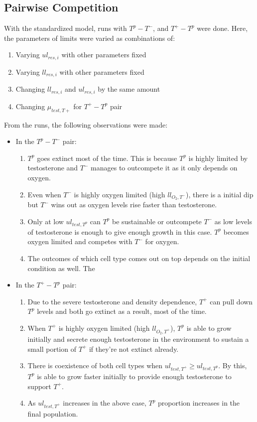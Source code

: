 \documentclass[11pt,a4paper]{article}
\begin{document}
\subsection{Pairwise Competition}
With the standardized model, runs with $T^p - T^-$, and $T^+ - T^p$ were done. Here, the parameters of limits were varied as combinations of:
\begin{enumerate}
  \item Varying $ul_{res,i}$ with other parameters fixed
  \item Varying $ll_{res,i}$ with other parameters fixed
  \item Changing $ll_{res,i}$ and $ul_{res,i}$ by the same amount
  \item Changing $\mu_{test,T+}$ for $T^+ - T^p$ pair
\end{enumerate}
From the runs, the following observations were made:
\begin{itemize}
  \item In the $T^p - T^-$ pair:
  \begin{enumerate}
    \item $T^p$ goes extinct most of the time. This is because $T^p$ is highly limited by testosterone and $T^-$ manages to outcompete it as it only depends on oxygen.
    \item Even when $T^-$ is highly oxygen limited (high $ll_{O_2,T^-}$), there is a initial dip but $T^-$ wins out as oxygen levels rise faster than testosterone.
    \item Only at low $ul_{test,T^p}$ can $T^p$ be sustainable or outcompete $T^-$ as low levels of testosterone is enough to give enough growth in this case. $T^p$ becomes oxygen limited and competes with $T^-$ for oxygen.
    \item The outcomes of which cell type comes out on top depends on the initial condition as well. The
  \end{enumerate}
  \item In the $T^+ - T^p$ pair:
  \begin{enumerate}
    \item Due to the severe testosterone and density dependence, $T^+$ can pull down $T^p$ levels and both go extinct as a result, most of the time.
    \item When $T^+$ is highly oxygen limited (high $ll_{O_2,T^+}$), $T^p$ is able to grow initially and secrete enough testosterone in the environment to sustain a small portion of $T^+$ if they're not extinct already.
    \item There is coexistence of both cell types when $ul_{test,T^+} \geq ul_{test,T^p}$. By this, $T^p$ is able to grow faster initially to provide enough testosterone to support $T^+$.
    \item As $ul_{test,T^+}$ increases in the above case, $T^p$ proportion increases in the final population.
  \end{enumerate}
\end{itemize}
\end{document}
